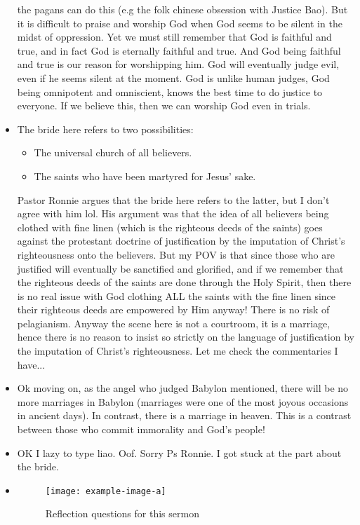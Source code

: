 \begin{itemize}
{  the pagans can do this (e.g the folk chinese obsession with Justice Bao).
  But it is difficult to praise and worship God when God seems to be silent
  in the midst of oppression.  Yet we must still remember that God is
  faithful and true, and in fact God is eternally faithful and true.  And God
  being faithful and true is our reason for worshipping him.  God will
  eventually judge evil, even if he seems silent at the moment.  God is
  unlike human judges, God being omnipotent and omniscient, knows the best
  time to do justice to everyone.  If we believe this, then we can worship
  God even in trials.}
  \item{The bride here refers to two possibilities:
  \begin{itemize}
    \item{The universal church of all believers.}
    \item{The saints who have been martyred for Jesus' sake.}
  \end{itemize}
  Pastor Ronnie argues that the bride here refers to the latter, but I don't
  agree with him lol.  His argument was that the idea of all believers being
  clothed with fine linen (which is the righteous deeds of the saints) goes
  against the protestant doctrine of justification by the imputation of
  Christ's righteousness onto the believers.  But my POV is that since those
  who are justified will eventually be sanctified and glorified, and if we
  remember that the righteous deeds of the saints are done through the Holy
  Spirit, then there is no real issue with God clothing ALL the saints with
  the fine linen since their righteous deeds are empowered by Him anyway!
  There is no risk of pelagianism.  Anyway the scene here is not a
  courtroom, it is a marriage, hence there is no reason to insist so strictly
  on the language of justification by the imputation of Christ's
  righteousness.  Let me check the commentaries I have...}
  \item{Ok moving on, as the angel who judged Babylon mentioned, there will
  be no more marriages in Babylon (marriages were one of the most joyous
  occasions in ancient days).  In contrast, there is a marriage in heaven.
  This is a contrast between those who commit immorality and God's people!}
  \item{OK I lazy to type liao. Oof. Sorry Ps Ronnie. I got stuck at the part about the bride.}
  \item{\begin{figure}[H]
    \centering
    \texttt{[image: example-image-a]}
    \caption[]{Reflection questions for this sermon}
  \end{figure}}
\end{itemize}